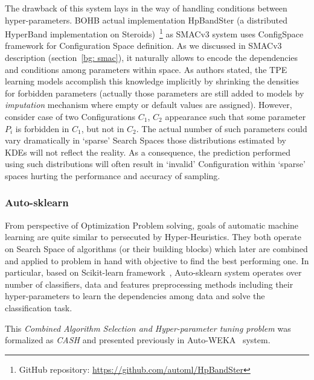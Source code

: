 The drawback of this system lays in the way of handling conditions between hyper-parameters. BOHB actual implementation HpBandSter (a distributed HyperBand implementation on Steroids)~\footnote[1]{GitHub repository: \url{https://github.com/automl/HpBandSter}} as SMACv3 system uses ConfigSpace framework for Configuration Space definition. As we discussed in SMACv3 description (section~\ref{bg: smac}), it naturally allows to encode the dependencies and conditions among parameters within space. As authors stated, the TPE learning models accomplish this knowledge implicitly by shrinking the densities for forbidden parameters (actually those parameters are still added to models by \textit{imputation} mechanism where empty or default values are assigned). 
However, consider case of two Configurations $C_1$, $C_2$ appearance such that some parameter $P_i$ is forbidden in $C_1$, but not in $C_2$. The actual number of such parameters could vary dramatically in `sparse' Search Spaces those distributions estimated by KDEs will not reflect the reality. As a consequence, the prediction performed using such distributions will often result in `invalid' Configuration within `sparse' spaces hurting the performance and accuracy of sampling.



\subsubsection{Auto-sklearn~\cite{feurer2015efficient}}
From perspective of Optimization Problem solving, goals of automatic machine learning are quite similar to persecuted by Hyper-Heuristics. 
They both operate on Search Space of algorithms (or their building blocks) which later are combined and applied to problem in hand with objective to find the best performing one. In particular, based on Scikit-learn framework~\cite{scikit-learn}, Auto-sklearn system operates over number of classifiers, data and features preprocessing methods including their hyper-parameters to learn the dependencies among data and solve the classification task. %

This \textit{Combined Algorithm Selection and Hyper-parameter tuning problem} was formalized as \textit{CASH} and presented previously in Auto-WEKA~\cite{thornton2013auto} system.

